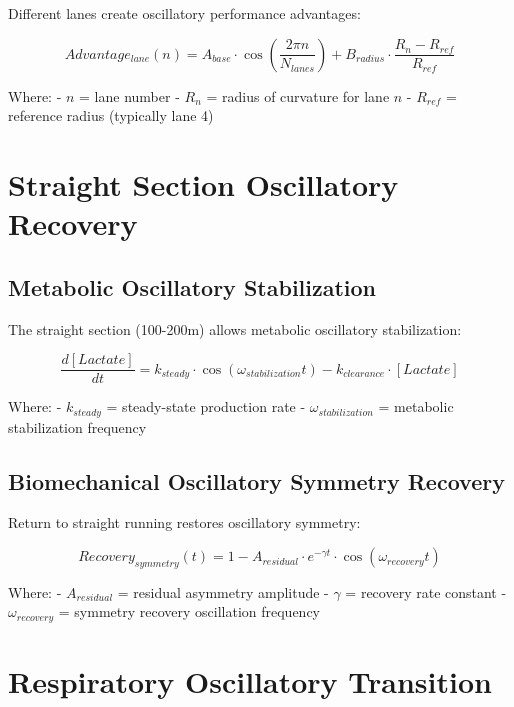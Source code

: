 \documentclass[12pt]{article}
\begin{document}
Different lanes create oscillatory performance advantages:

\begin{equation}
Advantage_{lane}(n) = A_{base} \cdot \cos\left(\frac{2\pi n}{N_{lanes}}\right) + B_{radius} \cdot \frac{R_n - R_{ref}}{R_{ref}}
\end{equation}

Where:
- $n$ = lane number
- $R_n$ = radius of curvature for lane $n$
- $R_{ref}$ = reference radius (typically lane 4)

\section{Straight Section Oscillatory Recovery}

\subsection{Metabolic Oscillatory Stabilization}

The straight section (100-200m) allows metabolic oscillatory stabilization:

\begin{equation}
\frac{d[Lactate]}{dt} = k_{steady} \cdot \cos(\omega_{stabilization}t) - k_{clearance} \cdot [Lactate]
\end{equation}

Where:
- $k_{steady}$ = steady-state production rate
- $\omega_{stabilization}$ = metabolic stabilization frequency

\subsection{Biomechanical Oscillatory Symmetry Recovery}

Return to straight running restores oscillatory symmetry:

\begin{equation}
Recovery_{symmetry}(t) = 1 - A_{residual} \cdot e^{-\gamma t} \cdot \cos(\omega_{recovery}t)
\end{equation}

Where:
- $A_{residual}$ = residual asymmetry amplitude
- $\gamma$ = recovery rate constant
- $\omega_{recovery}$ = symmetry recovery oscillation frequency

\section{Respiratory Oscillatory Transition}
\end{document}

